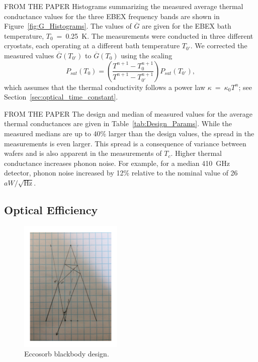 FROM THE PAPER
Histograms summarizing the measured average thermal conductance values for the three \ac{EBEX} frequency bands are shown in 
Figure~\ref{fig:G_Histograms}. The values of  $\overline{G}$ are given for the \ac{EBEX} bath temperature, $T_{0}$~=~0.25~K.
The measurements were conducted in three different cryostats, each operating at 
a different bath temperature $T_{0'}$. We corrected the measured values $\overline{G}(T_{0'})$ to $\overline{G}(T_{0})$ using 
the scaling
\begin{equation}
P_{sat}(T_0) = \left( \frac{T^{n+1}-T_0^{n+1}}{T^{n+1}-T_{0'}^{n+1}} \right) P_{sat}(T_{0'}),
\label{eqn:ScalePsat}
\end{equation}
which assumes that the thermal conductivity follows a power law $\kappa$~=~$\kappa_{0} T^{n}$; see Section~\ref{sec:optical_time_constant}. 

FROM THE PAPER
The design and median of measured values for the average thermal conductances are given in Table~\ref{tab:Design_Params}. While the 
measured medians are up to 40\% larger than the design values, the spread in the measurements is even larger. This spread is 
a consequence of variance between wafers and is also apparent in the measurements of $T_{c}$. 
Higher thermal conductance increases phonon noise. For example, for a median 410~GHz detector, phonon noise increased by 
12\% relative to the nominal value of 26~$aW/\sqrt{\mathrm{Hz}}$. 


\subsection{Optical Efficiency}
\label{sec:optical_efficiency}

\begin{figure}[ht!]
\begin{center}
\includegraphics[height=2.5in]{figures/blackbody_design2}
\caption{Eccosorb blackbody design. 
\label{fig:blackbody_design} }
\end{center}
\end{figure}

